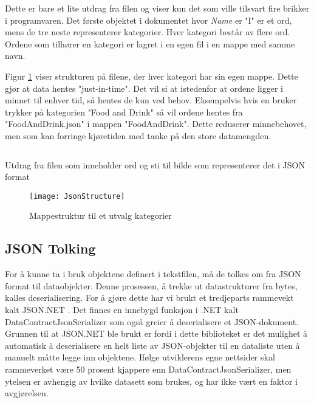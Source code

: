 Dette er bare et lite utdrag fra filen og viser kun det som ville tilsvart fire brikker i programvaren. Det første objektet i dokumentet hvor \textit{Name} er "I" er et ord, mens de tre neste representerer kategorier. Hver kategori består av flere ord. Ordene som tilhører en kategori er lagret i en egen fil i en mappe med samme navn. 

Figur \ref{fig:jsonstructure} viser strukturen på filene, der hver kategori har sin egen mappe. Dette gjør at data hentes "just-in-time". Det vil si at istedenfor at ordene ligger i minnet til enhver tid, så hentes de kun ved behov. Eksempelvis hvis en bruker trykker på kategorien "Food and Drink" så vil ordene hentes fra "FoodAndDrink.json" i mappen "FoodAndDrink". Dette reduserer minnebehovet, men som kan forringe kjøretiden med tanke på den store datamengden.



\begin{listing}[ht] 
\inputminted[fontsize=\footnotesize, frame=lines,framesep=2mm,baselinestretch=1.2,bgcolor=lightgray,linenos]{json}{Code/JSONfile.json} 
\caption{Utdrag fra filen som inneholder ord og sti til bilde som representerer det i JSON format} 
\label{listing:jsonfile} 
\end{listing} 
 

 \begin{figure}[ht!] 
\centering 
\texttt{[image: JsonStructure]} 
\caption{Mappestruktur til et utvalg kategorier} 
\label{fig:jsonstructure} 
\end{figure} 


\subsection{JSON Tolking}

For å kunne ta i bruk objektene definert i tekstfilen, må de tolkes om fra JSON format til dataobjekter. Denne prosessen, å trekke ut datastrukturer fra bytes, kalles deserialisering. For å gjøre dette har vi brukt et tredjeparts rammevekt kalt JSON.NET \cite{Json.0:online}. Det finnes en innebygd funksjon i .NET kalt DataContractJsonSerializer \cite{DataC3:online} som også greier å deserialisere et JSON-dokument. Grunnen til at JSON.NET ble brukt er fordi i dette biblioteket er det mulighet å automatisk å deserialisere en helt liste av JSON-objekter til en dataliste uten å manuelt måtte legge inn objektene. Ifølge utviklerens egne nettsider skal rammeverket være 50 prosent kjappere enn DataContractJsonSerializer, men ytelsen er avhengig av hvilke datasett som brukes, og har ikke vært en faktor i avgjørelsen. 


